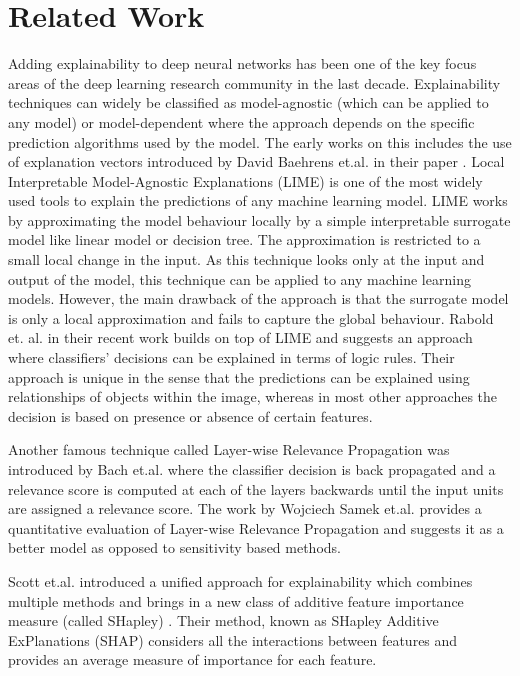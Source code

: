 \documentclass{}
\begin{document}
\section{Related Work}
Adding explainability to deep neural networks has been one of the key focus areas of the deep learning research community in the last decade.
Explainability techniques can widely be classified as model-agnostic (which can be applied to any model) or model-dependent where the approach depends on the specific prediction algorithms used by the model.
The early works on this includes the use of explanation vectors introduced by David Baehrens et.al. in their paper \cite{baehrens2010explain}.
Local Interpretable Model-Agnostic Explanations (LIME) \cite{ribeiro2016should} is one of the most widely used tools to explain the predictions of any machine learning model.
LIME works by approximating the model behaviour locally by a simple interpretable surrogate model like linear model or decision tree. The approximation is restricted to a small local change in the input. As this technique looks only at the input and output of the model, this technique can be applied to any machine learning models.
However, the main drawback of the approach is that the surrogate model is only a local approximation and fails to capture the global behaviour.
Rabold et. al. in their recent work \cite{rabold2019enriching} builds on top of LIME and suggests an approach where classifiers' decisions can be explained in terms of logic rules. Their approach is unique in the sense that the predictions can be explained using relationships of objects within the image, whereas in most other approaches the decision is based on presence or absence of certain features.

Another famous technique called Layer-wise Relevance Propagation was introduced by Bach et.al. \cite{bach2015pixel} where the classifier decision is  back propagated and a relevance score is computed at each of the layers backwards until the input units are assigned a relevance score.
The work by Wojciech Samek et.al. \cite{samek2016evaluating} provides a quantitative  evaluation of Layer-wise Relevance Propagation and  suggests it as a better model as opposed to sensitivity based methods.

Scott et.al. introduced a unified approach for explainability which combines multiple methods and brings in a new class of additive feature importance measure (called SHapley) \cite{lundberg2017unified}.
Their method, known as SHapley Additive ExPlanations (SHAP) considers all  the interactions between features and provides an average measure of importance for each feature.
\end{document}
